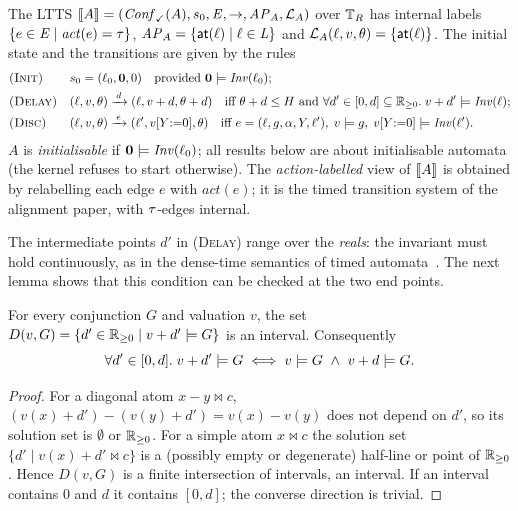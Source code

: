 \begin{definition}\label{def:source-sem}
The LTTS $\llbracket A \rrbracket=(\mathit{Conf}_{\checkmark}(A),s_0,\mathit{E},\to,\mathit{AP}_A,\mathcal{L}_A)$ over $\mathbb{T}_R$ has
internal labels $\{e\in\mathit{E}\mid \mathit{act}(e)=\tau\}$,
$\mathit{AP}_A=\{\mathsf{at}(\ell)\mid\ell\in\mathit{L}\}$ and $\mathcal{L}_A(\ell,v,\theta)=\{\mathsf{at}(\ell)\}$.
The initial state and the transitions are given by the rules
\begin{align*}
&\textsc{(Init)} && s_0=(\ell_0,\mathbf{0},0) \quad\text{provided } \mathbf{0}\models\mathit{Inv}(\ell_0);\\
&\textsc{(Delay)} && (\ell,v,\theta)\xrightarrow{\,d\,}(\ell,v+d,\theta+d)
  \quad\text{iff } \theta+d\le H \text{ and } \forall d'\in[0,d]\subseteq\mathbb{R}_{\geq 0}.\;v+d'\models\mathit{Inv}(\ell);\\
&\textsc{(Disc)} && (\ell,v,\theta)\xrightarrow{\,e\,}(\ell',v[Y{:=}0],\theta)
  \quad\text{iff } e=(\ell,g,\alpha,Y,\ell'),\; v\models g,\; v[Y{:=}0]\models\mathit{Inv}(\ell').
\end{align*}
$A$ is \emph{initialisable} if $\mathbf{0}\models\mathit{Inv}(\ell_0)$; all results below
are about initialisable automata (the kernel refuses to start otherwise).
The \emph{action-labelled} view of $\llbracket A \rrbracket$ is obtained by relabelling each
edge $e$ with $\mathit{act}(e)$; it is the timed transition system of the
alignment paper, with $\tau$-edges internal.
\end{definition}

The intermediate points $d'$ in \textsc{(Delay)} range over the \emph{reals}: the
invariant must hold continuously, as in the dense-time semantics of timed
automata~\cite{alur-dill,uppaal}. The next lemma shows that this condition can be
checked at the two end points.

\begin{lemma}\label{lem:convex}
For every conjunction $G$ and valuation $v$, the set
$D(v,G)=\{d'\in\mathbb{R}_{\geq 0}\mid v+d'\models G\}$ is an interval. Consequently
\[
  \forall d'\in[0,d].\;v+d'\sat G \iff v\sat G\ \wedge\ v+d\sat G .
\]
\end{lemma}
\begin{proof}
For a diagonal atom $x-y\bowtie c$, $(v(x)+d')-(v(y)+d')=v(x)-v(y)$ does not depend
on $d'$, so its solution set is $\emptyset$ or $\mathbb{R}_{\geq 0}$. For a simple atom
$x\bowtie c$ the solution set $\{d'\mid v(x)+d'\bowtie c\}$ is a (possibly empty
or degenerate) half-line or point of $\mathbb{R}_{\geq 0}$. Hence $D(v,G)$ is a finite
intersection of intervals, an interval. If an interval contains $0$ and $d$ it
contains $[0,d]$; the converse direction is trivial.
\end{proof}

